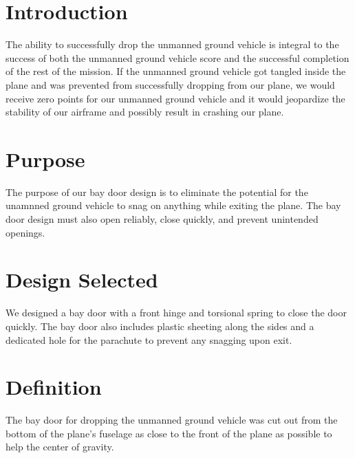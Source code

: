 \documentclass[]{auvsi_doc}
\begin{document}
\begin{AUVSITitlePage}
\begin{artifacttable}
\end{artifacttable}
\end{AUVSITitlePage}

\section{Introduction}

The ability to successfully drop the unmanned ground vehicle is integral to the success of both the unmanned ground vehicle score and the successful completion of the rest of the mission. If the unmanned ground vehicle got tangled inside the plane and was prevented from successfully dropping from our plane, we would receive zero points for our unmanned ground vehicle and it would jeopardize the stability of our airframe and possibly result in crashing our plane.

\section{Purpose}

The purpose of our bay door design is to eliminate the potential for the unamnned ground vehicle to snag on anything while exiting the plane. The bay door design must also open reliably, close quickly, and prevent unintended openings.

\section{Design Selected}

We designed a bay door with a front hinge and torsional spring to close the door quickly. The bay door also includes plastic sheeting along the sides and a dedicated hole for the parachute to prevent any snagging upon exit.

\section{Definition}

The bay door for dropping the unmanned ground vehicle was cut out from the bottom of the plane's fuselage as close to the front of the plane as possible to help the center of gravity.
\end{document}
